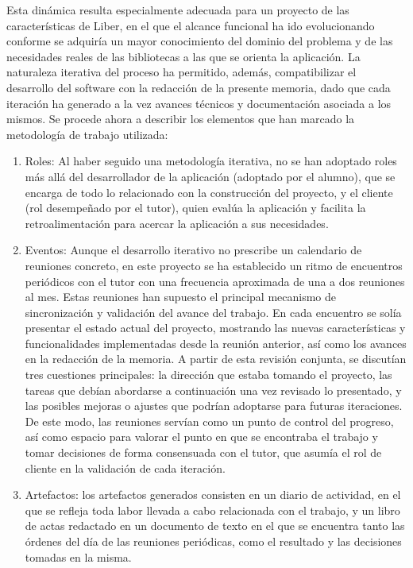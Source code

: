 Esta dinámica resulta especialmente adecuada para un proyecto de las características de Liber, en el que el alcance funcional ha ido evolucionando conforme se adquiría un mayor conocimiento del dominio del problema y de las necesidades reales de las bibliotecas a las que se orienta la aplicación. La naturaleza iterativa del proceso ha permitido, además, compatibilizar el desarrollo del software con la redacción de la presente memoria, dado que cada iteración ha generado a la vez avances técnicos y documentación asociada a los mismos.
Se procede ahora a describir los elementos que han marcado la metodología de trabajo utilizada:
\begin{enumerate}
	\item Roles: Al haber seguido una metodología iterativa, no se han adoptado roles más allá del desarrollador de la aplicación (adoptado por el alumno), que se encarga de todo lo relacionado con la construcción del proyecto, y el cliente (rol desempeñado por el tutor), quien evalúa la aplicación y facilita la retroalimentación para acercar la aplicación a sus necesidades.
	\item Eventos: Aunque el desarrollo iterativo no prescribe un calendario de reuniones concreto, en este proyecto se ha establecido un ritmo	de encuentros periódicos con el tutor con una frecuencia aproximada de una a dos reuniones al mes. Estas reuniones han supuesto el principal mecanismo de sincronización y validación del avance del trabajo. En cada encuentro se  solía presentar el estado actual del proyecto, mostrando las nuevas características y funcionalidades implementadas desde la reunión anterior, así como los avances en la redacción de la memoria. A partir de esta revisión conjunta, se discutían tres cuestiones principales: la dirección que estaba tomando el proyecto, las tareas que debían abordarse a continuación una vez revisado lo presentado, y las posibles mejoras o ajustes que podrían adoptarse para futuras iteraciones. De este modo, las reuniones servían como un punto de control del progreso, así como espacio para valorar el punto en que se encontraba el trabajo y tomar decisiones de forma consensuada con el tutor, que asumía el rol de cliente en la validación de cada iteración.
	\item Artefactos: los artefactos generados consisten en un diario de actividad, en el que se refleja toda labor llevada a cabo relacionada con el trabajo, y un libro de actas redactado en un documento de texto en el que se encuentra tanto las órdenes del día de las reuniones periódicas, como el resultado y las decisiones tomadas en la misma.

\end{enumerate}
